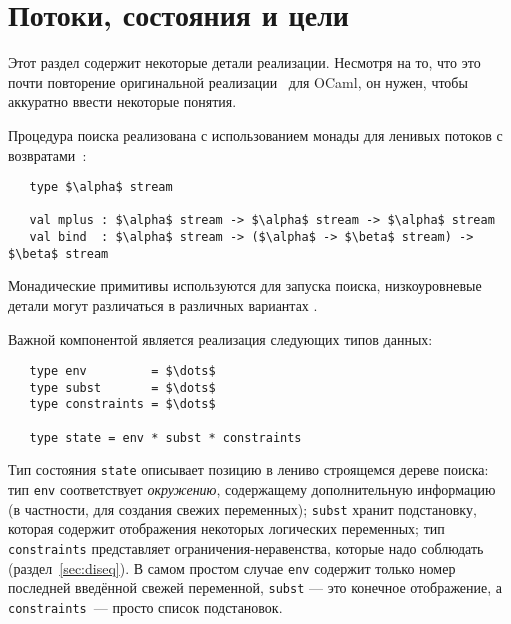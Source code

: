 
\section{Потоки, состояния и цели}
\label{sec:goals}

Этот раздел содержит некоторые детали  реализации.
Несмотря на то, что это почти повторение оригинальной реализации~\cite{MicroKanren, CKanren} для OCaml, он нужен, чтобы аккуратно ввести некоторые понятия.

Процедура поиска реализована с использованием монады для ленивых потоков с возвратами~\cite{KiselyovBacktracking}:

\begin{lstlisting}
   type $\alpha$ stream

   val mplus : $\alpha$ stream -> $\alpha$ stream -> $\alpha$ stream
   val bind  : $\alpha$ stream -> ($\alpha$ -> $\beta$ stream) -> $\beta$ stream
\end{lstlisting}

\noindent Монадические примитивы используются для запуска поиска, низкоуровневые детали могут различаться в  различных вариантах \miniKanren.

Важной компонентой является реализация следующих типов данных:

\begin{lstlisting}
   type env         = $\dots$
   type subst       = $\dots$
   type constraints = $\dots$

   type state = env * subst * constraints
\end{lstlisting}
Тип состояния \lstinline|state| описывает позицию в лениво строящемся дереве поиска:
тип \lstinline|env| соответствует  \emph{окружению}, содержащему дополнительную информацию (в частности, для создания свежих переменных);
\lstinline|subst| хранит подстановку, которая содержит отображения некоторых логических переменных;
тип \lstinline|constraints| представляет ограничения-неравенства, которые надо соблюдать (раздел~\ref{sec:diseq}).
В самом простом случае \lstinline|env| содержит только номер последней введённой свежей переменной, \lstinline|subst| --- это конечное отображение, а \lstinline|constraints|~--- просто список подстановок.

